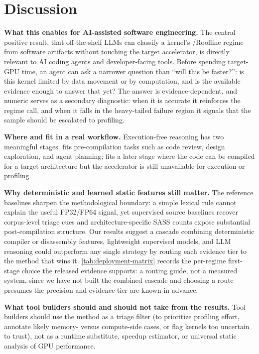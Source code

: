 \section{Discussion}
\label{sec:discussion}

\noindent\textbf{What this enables for AI-assisted software engineering.}
The central positive result, that off-the-shelf LLMs can classify a kernel's \bandwidthbound/\computebound Roofline regime from software artifacts without touching the target accelerator, is directly relevant to AI coding agents and developer-facing tools.
Before spending target-GPU time, an agent can ask a narrower question than ``will this be faster?'': is this kernel limited by data movement or by computation, and is the available evidence enough to answer that yet?
The answer is evidence-dependent, and numeric \rai serves as a secondary diagnostic: when it is accurate it reinforces the regime call, and when it falls in the heavy-tailed failure region it signals that the sample should be escalated to profiling.

\noindent\textbf{Where \sourceonly and \sourcesass fit in a real workflow.}
Execution-free reasoning has two meaningful stages.
\sourceonly fits pre-compilation tasks such as code review, design exploration, and agent planning; \sourcesass fits a later stage where the code can be compiled for a target architecture but the accelerator is still unavailable for execution or profiling.

\noindent\textbf{Why deterministic and learned static features still matter.}
The reference baselines sharpen the methodological boundary: a simple lexical rule cannot explain the useful FP32/FP64 \sourceonly signal, yet supervised source baselines recover corpus-level triage cues and architecture-specific SASS counts expose substantial post-compilation structure.
Our results suggest a cascade combining deterministic compiler or disassembly features, lightweight supervised models, and LLM reasoning could outperform any single strategy by routing each evidence tier to the method that wins it.
\autoref{tab:deployment-matrix} records the per-regime first-stage choice the released evidence supports: a routing guide, not a measured system, since we have not built the combined cascade and choosing a route presumes the precision and evidence tier are known in advance.



\noindent\textbf{What tool builders should and should not take from the results.}
Tool builders should use the method as a triage filter (to prioritize profiling effort, annotate likely memory- versus compute-side cases, or flag kernels too uncertain to trust), not as a runtime substitute, speedup estimator, or universal static analysis of GPU performance.

